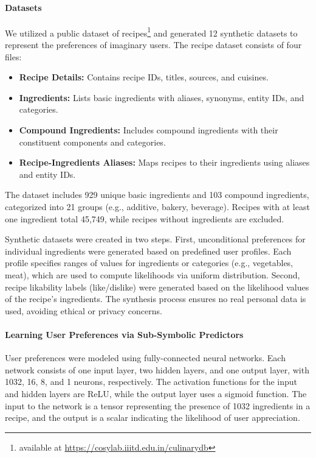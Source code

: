 \paragraph{Datasets}\label{par:datasets-ske-nutrition}
%
We utilized a public dataset of recipes\footnote{available at \url{https://cosylab.iiitd.edu.in/culinarydb}} and generated 12 synthetic datasets to represent the preferences of imaginary users.
%
The recipe dataset consists of four files:
%
\begin{itemize}
  \item \textbf{Recipe Details:} Contains recipe IDs, titles, sources, and cuisines.
  \item \textbf{Ingredients:} Lists basic ingredients with aliases, synonyms, entity IDs, and categories.
  \item \textbf{Compound Ingredients:} Includes compound ingredients with their constituent components and categories.
  \item \textbf{Recipe-Ingredients Aliases:} Maps recipes to their ingredients using aliases and entity IDs.
\end{itemize}
%
The dataset includes 929 unique basic ingredients and 103 compound ingredients, categorized into 21 groups (e.g., additive, bakery, beverage).
%
Recipes with at least one ingredient total 45,749, while recipes without ingredients are excluded.

Synthetic datasets were created in two steps.
%
First, unconditional preferences for individual ingredients were generated based on predefined user profiles.
%
Each profile specifies ranges of values for ingredients or categories (e.g., vegetables, meat), which are used to compute likelihoods via uniform distribution.
%
Second, recipe likability labels (like/dislike) were generated based on the likelihood values of the recipe's ingredients.
%
The synthesis process ensures no real personal data is used, avoiding ethical or privacy concerns.


\paragraph{Learning User Preferences via Sub-Symbolic Predictors}\label{par:learning-user-preferences}
%
User preferences were modeled using fully-connected neural networks.
%
Each network consists of one input layer, two hidden layers, and one output layer, with 1032, 16, 8, and 1 neurons, respectively.
%
The activation functions for the input and hidden layers are \gls{ReLU}, while the output layer uses a sigmoid function.
%
The input to the network is a tensor representing the presence of 1032 ingredients in a recipe, and the output is a scalar indicating the likelihood of user appreciation.

